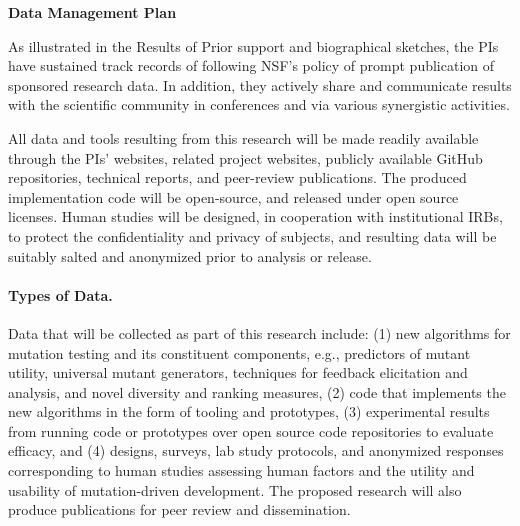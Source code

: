 \documentclass[11pt]{article}
\begin{document}
\begin{center}
{\Large\sf\textbf{Data Management Plan }} 
\end{center}


As illustrated in the Results of Prior support and biographical sketches, the
PIs have sustained track records of following NSF's policy of prompt publication
of sponsored research data.  In addition, they actively share and communicate
results with the scientific community in conferences and via various synergistic
activities.

All data and tools resulting from this research will be made readily available
through the PIs' websites, related project websites, publicly available GitHub
repositories, technical reports, and peer-review publications.  The produced
implementation code will be open-source, and released under open source
licenses.  Human studies will be designed, in cooperation with institutional
IRBs, to protect the confidentiality and privacy of subjects, and resulting data
will be suitably salted and anonymized prior to analysis or release.


\paragraph{Types of Data.} Data that will be collected as part of this research
include: (1) new algorithms for mutation testing and its constituent components,
e.g., predictors of mutant utility, universal mutant generators, techniques for
feedback elicitation and analysis, and novel diversity and ranking measures, (2)
code that implements the new algorithms in the form of tooling and prototypes,
(3) experimental results from running code or prototypes over open source code
repositories to evaluate efficacy, and (4) designs, surveys, lab study
protocols, and anonymized responses corresponding to human studies assessing
human factors and the utility and usability of mutation-driven development.  The
proposed research will also produce publications for peer review and
dissemination.
\end{document}
